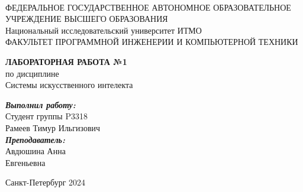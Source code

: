 \documentclass[14pt]{article}
\begin{document}
\begin{spacing}{1}
\begin{center}
	 \\
	\vspace{5mm}
	ФЕДЕРАЛЬНОЕ ГОСУДАРСТВЕННОЕ АВТОНОМНОЕ ОБРАЗОВАТЕЛЬНОЕ \\ УЧРЕЖДЕНИЕ ВЫСШЕГО ОБРАЗОВАНИЯ  \\
	\guillemotleft Национальный исследовательский университет ИТМО\guillemotright \\
	\vspace{5mm}
	ФАКУЛЬТЕТ ПРОГРАММНОЙ ИНЖЕНЕРИИ И КОМПЬЮТЕРНОЙ ТЕХНИКИ
	\vspace{60mm}
	
	{\bf \LARGE ЛАБОРАТОРНАЯ РАБОТА №1} \\
	{ \Large по дисциплине \\
	\guillemotleft Системы искусственного интелекта \guillemotright \\}
\end{center}
\vspace{50mm}

\begin{flushright}
	{\it \textbf{Выполнил работу:}}\\
	Студент группы P3318 \\
	Рамеев Тимур Ильгизович \\
	{\it \textbf{Преподаватель:}}\\
	Авдюшина Анна\\
	Евгеньевна \\
\end{flushright}
\vspace{18mm}
\end{spacing}
\begin{center}
    Санкт-Петербург  2024
\end{center}


\newpage
\begin{center}
	\tableofcontents 
\end{center}
\setcounter{page}{1}
\end{document}

